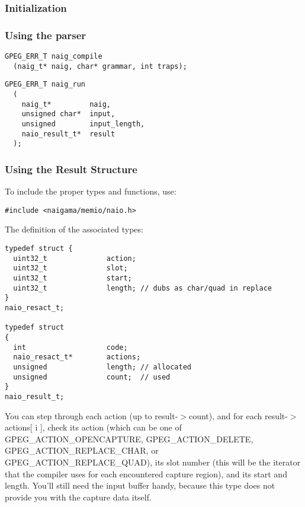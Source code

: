 \subsubsection{Initialization}

\subsubsection{Using the parser}

\begin{myquote}
\begin{verbatim}
GPEG_ERR_T naig_compile
  (naig_t* naig, char* grammar, int traps);
\end{verbatim}
\end{myquote}

\begin{myquote}
\begin{verbatim}
GPEG_ERR_T naig_run
  (
    naig_t*         naig,
    unsigned char*  input,
    unsigned        input_length,
    naio_result_t*  result
  );
\end{verbatim}
\end{myquote}

\subsubsection{Using the Result Structure}

To include the proper types and functions, use:

\begin{myquote}
\begin{verbatim}
#include <naigama/memio/naio.h>
\end{verbatim}
\end{myquote}

The definition of the associated types:

\begin{myquote}
\begin{verbatim}
typedef struct {
  uint32_t              action;
  uint32_t              slot;
  uint32_t              start;
  uint32_t              length; // dubs as char/quad in replace
}
naio_resact_t;

typedef struct
{
  int                   code;
  naio_resact_t*        actions;
  unsigned              length; // allocated
  unsigned              count;  // used
}
naio_result_t;
\end{verbatim}
\end{myquote}

You can step through each action (up to result-$>$count),
and for each result-$>$actions[ i ], check its action
(which can be one of GPEG\_ACTION\_OPENCAPTURE,
GPEG\_ACTION\_DELETE, GPEG\_ACTION\_REPLACE\_CHAR, or
GPEG\_ACTION\_REPLACE\_QUAD),
its slot number (this will be the iterator that the compiler uses
for each encountered capture region), and its start and length.
You'll still need the input buffer handy, because this type does
not provide you with the capture data itself.

